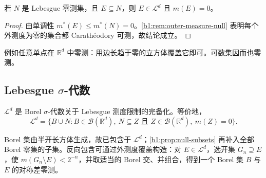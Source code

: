 \begin{proposition}
\label{b1:prop:null-subsets}
若 \(N\) 是 Lebesgue 零测集，且 \(E\subseteq N\)，则 \(E\in\mathcal L^d\) 且 \(m(E)=0\)。
\end{proposition}
\begin{proof}
由单调性 \(m^*(E)\leq m^*(N)=0\)。\cref{b1:rem:outer-measure-null} 表明每个外测度为零的集合都 Carathéodory 可测，故结论成立。
\end{proof}

例如任意单点在 \(\mathbb R^d\) 中零测：用边长趋于零的立方体覆盖它即可。可数集因而也零测。

\subsection{Lebesgue \texorpdfstring{\(\sigma\)}{σ}-代数}
\label{b1:subsec:030204}

\begin{theorem}
\label{b1:thm:lebesgue-completion-borel}
\(\mathcal L^d\) 是 Borel \(\sigma\)-代数关于 Lebesgue 测度限制的完备化。等价地，
\[
\mathcal L^d
=\{B\cup N:B\in\mathcal B(\mathbb R^d),\
N\subseteq Z\text{ 且 }Z\in\mathcal B(\mathbb R^d),\ m(Z)=0\}.
\]
\end{theorem}
\begin{proofsketch}
Borel 集由半开长方体生成，故已包含于 \(\mathcal L^d\)；\cref{b1:prop:null-subsets} 再补入全部 Borel 零集的子集。反向包含可通过外测度覆盖构造：对 \(E\in\mathcal L^d\)，选开集 \(G_n\supseteq E\)，使 \(m(G_n\setminus E)<2^{-n}\)，并取适当的 Borel 交、并组合，得到一个 Borel 集 \(B\) 与 \(E\) 的对称差零测。
\end{proofsketch}
